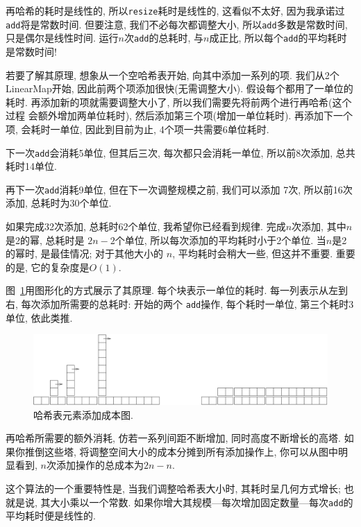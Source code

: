 \documentclass[10pt]{book}
\begin{document}
再哈希的耗时是线性的, 所以{\tt resize}耗时是线性的, 
这看似不太好, 因为我承诺过{\tt add}将是常数时间.
但要注意, 我们不必每次都调整大小, 所以{\tt add}多数是常数时间, 
只是偶尔是线性时间. 运行$n$次{\tt add}的总耗时, 与$n$成正比, 
所以每个{\tt add}的平均耗时是常数时间!

若要了解其原理, 想象从一个空哈希表开始, 向其中添加一系列的项.
我们从2个LinearMap开始, 因此前两个项添加很快(无需调整大小).
假设每个都用了一单位的耗时. 
再添加新的项就需要调整大小了, 所以我们需要先将前两个进行再哈希(这个过程
会额外增加两单位耗时), 然后添加第三个项(增加一单位耗时).
再添加下一个项, 会耗时一单位, 因此到目前为止, 4个项一共需要6单位耗时.

下一次{\tt add}会消耗5单位, 但其后三次, 每次都只会消耗一单位, 
所以前8次添加, 总共耗时14单位.

再下一次{\tt add}消耗9单位, 但在下一次调整规模之前, 我们可以添加
7次, 所以前16次添加, 总耗时为30个单位. 

如果完成32次添加, 总耗时62个单位, 我希望你已经看到规律.
完成$n$次添加, 其中$n$是2的幂,
总耗时是 $2n-2$个单位, 所以每次添加的平均耗时小于2个单位.
当$n$是2的幂时, 是最佳情况;
对于其他大小的 $n$, 平均耗时会稍大一些, 但这并不重要.
重要的是, 它的复杂度是$O(1)$.

图~\ref{fig.hash}用图形化的方式展示了其原理. 
每个块表示一单位的耗时. 
每一列表示从左到右, 每次添加所需要的总耗时: 开始的两个
{\tt add}操作, 每个耗时一单位, 第三个耗时3单位, 依此类推. 

\begin{figure}
\centerline{\includegraphics[width=5.5in]{figs/towers.pdf}}
\caption{哈希表元素添加成本图.\label{fig.hash}}
\end{figure}

再哈希所需要的额外消耗, 仿若一系列间距不断增加, 同时高度不断增长的高塔.
如果你推倒这些塔, 将调整空间大小的成本分摊到所有添加操作上, 
你可以从图中明显看到, $n$次添加操作的总成本为$2n-n$.

这个算法的一个重要特性是, 当我们调整哈希表大小时, 其耗时呈几何方式增长;
也就是说, 其大小乘以一个常数.
如果你增大其规模---每次增加固定数量---每次{\tt add}的平均耗时便是线性的.
\end{document}
